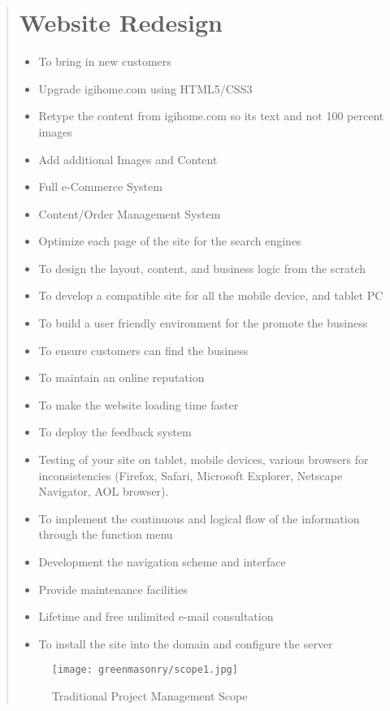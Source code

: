\documentclass[35pt]{report}
\begin{document}
\begin{quote}
		\section{Website Redesign}
		\begin{itemize}
			\item To bring in new customers
			\item Upgrade igihome.com using HTML5/CSS3 
			\item Retype the content from igihome.com so its text and not 100 percent images 
			\item Add additional Images and Content 
			\item Full e-Commerce System 
			\item Content/Order Management System 
			\item Optimize each page of the site for the search engines 
			\item To design the layout, content, and business logic from the scratch 
			\item To develop a compatible site for all the mobile device, and tablet PC 
			\item To build a user friendly environment for the promote the business 
			\item To ensure customers can find the business 
			\item To maintain an online reputation 
			\item To make the website loading time faster 
			\item To deploy the feedback system 
			\item Testing of your site on tablet, mobile devices, various browsers for inconsistencies (Firefox, Safari, Microsoft Explorer, Netscape Navigator, AOL browser). 
			\item To implement the continuous and logical ﬂow of the information through the function menu 
			\item Development the navigation scheme and interface 
			\item Provide maintenance facilities 
			\item Lifetime and free unlimited e-mail consultation 
			\item To install the site into the domain and configure the server 
		\end{itemize}
		
		\begin{figure}[htb]
			\begin{center}
				\texttt{[image: greenmasonry/scope1.jpg]}
				\caption{Traditional Project Management Scope }
			\end{center}
		\end{figure}


\end{quote}
\end{document}
